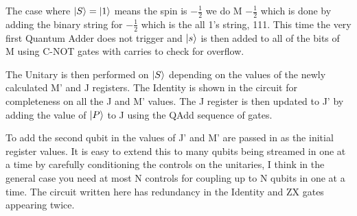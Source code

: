 \documentclass[landscape, 12pt]{article}
\begin{document}
The case where $\left\vert{S}\right\rangle = \left\vert{1}\right\rangle$ means the spin is $-\frac{1}{2}$ we do M $-\frac{1}{2}$ which is done by adding the binary string for $-\frac{1}{2}$ which is the all 1's string, 111. This time the very first Quantum Adder does not trigger and $\left\vert{s}\right\rangle$ is then added to all of the bits of M using C-NOT gates with carries to check for overflow. 

The Unitary is then performed on $\left\vert{S}\right\rangle$ depending on the values of the newly calculated M' and J registers. The Identity is shown in the circuit for completeness on all the J and M' values. The J register is then updated to J' by adding the value of $\left\vert{P}\right\rangle$ to J using the QAdd sequence of gates.

To add the second qubit in the values of J' and M' are passed in as the initial register values. It is easy to extend this to many qubits being streamed in one at a time by carefully conditioning the controls on the unitaries, I think in the general case you need at most N controls for coupling up to N qubits in one at a time. The circuit written here has redundancy in the Identity and ZX gates appearing twice. 
\end{document}
